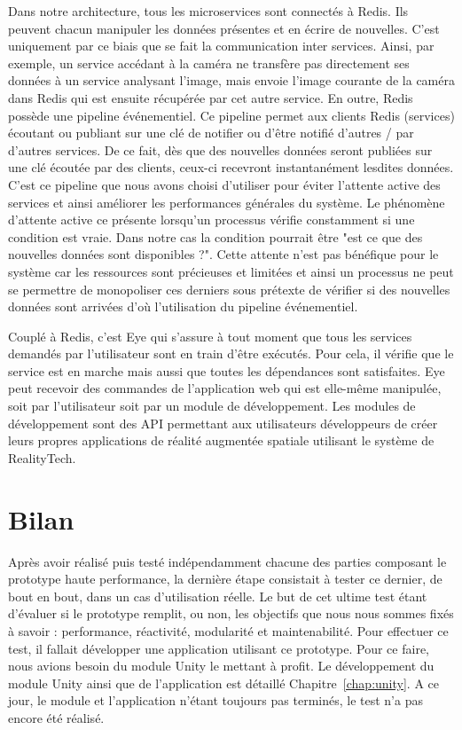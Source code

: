 Dans notre architecture, tous les microservices sont connectés à Redis. Ils peuvent chacun manipuler les données présentes et en écrire de nouvelles. C'est uniquement par ce biais que se fait la communication inter services. Ainsi, par exemple, un service accédant à la caméra ne transfère pas directement ses données à un service analysant l'image, mais envoie l'image courante de la caméra dans Redis qui est ensuite récupérée par cet autre service. En outre, Redis possède une pipeline événementiel. Ce pipeline permet aux clients Redis (services) écoutant ou publiant sur une clé de notifier ou d'être notifié d'autres / par d'autres services. De ce fait, dès que des nouvelles données seront publiées sur une clé écoutée par des clients, ceux-ci recevront instantanément lesdites données. C'est ce pipeline que nous avons choisi d'utiliser pour éviter l'attente active des services et ainsi améliorer les performances générales du système.
Le phénomène d'attente active ce présente lorsqu'un processus vérifie constamment si une condition est vraie. Dans notre cas la condition pourrait être "est ce que des nouvelles données sont disponibles ?". Cette attente n'est pas bénéfique pour le système car les ressources sont précieuses et limitées et ainsi un processus ne peut se permettre de monopoliser ces derniers sous prétexte de vérifier si des nouvelles données sont arrivées d'où l'utilisation du pipeline événementiel.

Couplé à Redis, c'est Eye qui s'assure à tout moment que tous les services demandés par l'utilisateur sont en train d'être exécutés. Pour cela, il vérifie que le service est en marche mais aussi que toutes les dépendances sont satisfaites. Eye peut recevoir des commandes de l'application web qui est elle-même manipulée, soit par l'utilisateur soit par un module de développement. Les modules de développement sont des API permettant aux utilisateurs développeurs de créer leurs propres applications de réalité augmentée spatiale utilisant le système de RealityTech.

\section{Bilan}
Après avoir réalisé puis testé indépendamment chacune des parties composant le prototype haute performance, la dernière étape consistait à tester ce dernier, de bout en bout, dans un cas d'utilisation réelle. Le but de cet ultime test étant d'évaluer si le prototype remplit, ou non, les objectifs que nous nous sommes fixés à savoir : performance, réactivité, modularité et maintenabilité. 
Pour effectuer ce test, il fallait développer une application utilisant ce prototype. Pour ce faire, nous avions besoin du module Unity le mettant à profit. Le développement du module Unity ainsi que de l'application est détaillé Chapitre~\ref{chap:unity}.
A ce jour, le module et l'application n'étant toujours pas terminés, le test n'a pas encore été réalisé.